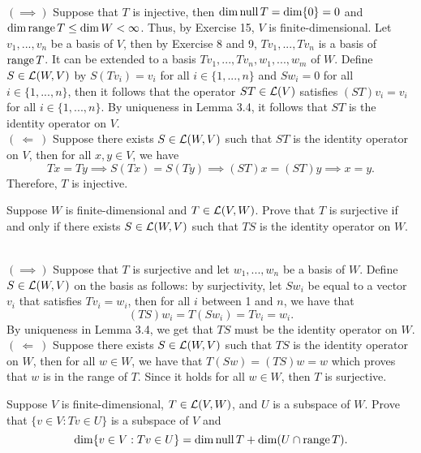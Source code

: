 \begin{solution}
    \\ $(\implies)$ Suppose that $T$ is injective, then $\dim \operatorname{\text{null}} T = \dim \{0\} = 0$ and $\dim \operatorname{\text{range}} T \leq \dim W < \infty$. Thus, by Exercise 15, $V$ is finite-dimensional. Let $v_1, ..., v_n$ be a basis of $V$, then by Exercise 8 and 9, $Tv_1, ..., Tv_n$ is a basis of $\operatorname{\text{range}} T$. It can be extended to a basis $Tv_1,..., Tv_n, w_1, ..., w_m$ of $W$. Define $S \in \mathcal{L}(W,V)$ by $S(Tv_i) = v_i$ for all $i \in \{1, ..., n\}$ and $Sw_i = 0$ for all $i \in \{1, ..., n\}$, then it follows that the operator $ST \in \mathcal{L}(V)$ satisfies $(ST)v_i = v_i$ for all $i \in \{1, ..., n\}$. By uniqueness in Lemma 3.4, it follows that $ST$ is the identity operator on $V$. \\
    $( \ \Longleftarrow \ )$ Suppose there exists $S \in \mathcal{L}(W,V)$ such that $ST$ is the identity operator on $V$, then for all $x, y \in V$, we have
    $$Tx = Ty \implies S(Tx) = S(Ty) \implies (ST)x = (ST)y \implies x = y.$$
    Therefore, $T$ is injective. \\
\end{solution}

\begin{exercise}
    Suppose $W$ is finite-dimensional and $T \in \mathcal{L}(V,W)$. Prove that $T$ is surjective if and only if there exists $S \in \mathcal{L}(W,V)$ such that $TS$ is the identity operator on $W$. \\
\end{exercise}

\begin{solution}
    \\ $(\implies)$ Suppose that $T$ is surjective and let $w_1, ..., w_n$ be a basis of $W$. Define $S \in \mathcal{L}(W,V)$ on the basis as follows: by surjectivity, let $Sw_i$ be equal to a vector $v_i$ that satisfies $Tv_i = w_i$, then for all $i$ between 1 and $n$, we have that
    $$(TS)w_i = T(Sw_i) = Tv_i = w_i.$$
    By uniqueness in Lemma 3.4, we get that $TS$ must be the identity operator on $W$. \\
    $( \ \Longleftarrow \ )$ Suppose there exists $S \in \mathcal{L}(W,V)$ such that $TS$ is the identity operator on $W$, then for all $w \in W$, we have that $T(Sw) = (TS)w = w$ which proves that $w$ is in the range of $T$. Since it holds for all $w \in W$, then $T$ is surjective. \\
\end{solution}

\begin{exercise}
    Suppose $V$ is finite-dimensional, $T \in \mathcal{L}(V,W)$, and $U$ is a subspace of $W$. Prove that $\{v \in V : Tv \in U\}$ is a subspace of $V$ and
    $$\dim \{v \in V : Tv \in U\} = \dim \operatorname{\text{null}} T + \dim (U \cap \operatorname{\text{range}} T).$$
\end{exercise}

